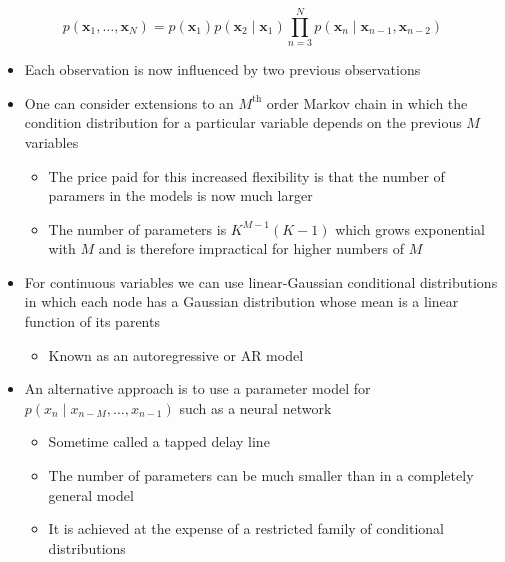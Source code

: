 \documentclass[11pt]{article}
\begin{document}
\begin{equation}
	p(\pmb x_1, \dots, \pmb x_N) = p(\pmb x_1) p(\pmb x_2 \mid \pmb x_1) \prod_{n=3}^N p(\pmb x_n \mid \pmb x_{n-1}, \pmb x_{n-2})  
\end{equation}  
\begin{itemize}
\item Each observation is now influenced by two previous observations

\item One can consider extensions to an \(M^\text{th}\)  order Markov chain in which the condition distribution for a particular variable depends on the previous \(M\) variables
\begin{itemize}
\item The price paid for this increased flexibility is that the number of paramers in the models is now much larger
\item The number of parameters is \(K^{M-1}(K-1)\) which grows exponential with \(M\) and is therefore impractical for higher numbers of \(M\)
\end{itemize}

\item For continuous variables we can use linear-Gaussian conditional distributions in which each node has a Gaussian distribution whose mean is a linear function of its parents
\begin{itemize}
\item Known as an autoregressive or AR model
\end{itemize}

\item An alternative approach is to use a parameter model for \(p(x_n \mid x_{n-M}, \dots, x_{n-1})\) such as a neural network
\begin{itemize}
\item Sometime called a tapped delay line
\item The number of parameters can be much smaller than in a completely general model
\item It is achieved at the expense of a restricted family of conditional distributions
\end{itemize}
\end{itemize}
\end{document}
